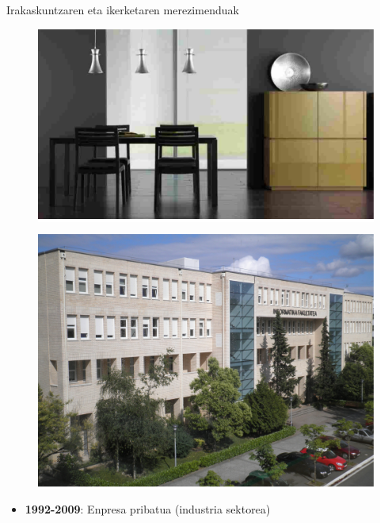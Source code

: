 \documentclass[
 10pt,%
 compress,%
 t,       %
 xcolor=svgnames
]{beamer}
\theoremstyle{definition} \newtheorem{definicion}{Definicion}[section]
\theoremstyle{propiedades} \newtheorem{propiedades}{Propiedades}[section]
\begin{document}
\begin{frame}{Irakaskuntzaren eta ikerketaren merezimenduak} 					  

\small 

\begin{figure}
	\begin{minipage}{.4\textwidth}
		\colorbox{white}  {\includegraphics[width=0.8\linewidth]{muebles-azcue}}
	\end{minipage}
	\begin{minipage}{.4\textwidth}
		\colorbox{white}  {\includegraphics[width=0.8\linewidth]{Informatika_fakultatea_001}}
	\end{minipage}
\end{figure}

\begin{itemize}
\item \textbf{1992-2009}: Enpresa pribatua (industria sektorea)


\end{itemize}
\end{frame}
\end{document}
